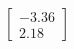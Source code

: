 \documentclass[preview]{standalone}
\begin{document}
\begin{align*}
\begin{bmatrix} -3.36 \\ 2.18 \end{bmatrix}
\end{align*}
\end{document}
